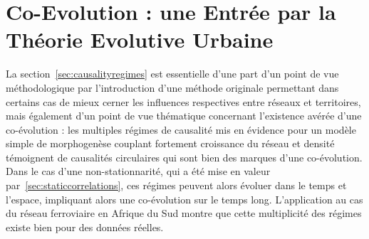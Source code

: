



\chapter[Théorie Evolutive Urbaine]{Co-Evolution : une Entrée par la Théorie Evolutive Urbaine}

\label{ch:evolutiveurban} %





\bigskip




La section~\ref{sec:causalityregimes} est essentielle d'une part d'un point de vue méthodologique par l'introduction d'une méthode originale permettant dans certains cas de mieux cerner les influences respectives entre réseaux et territoires, mais également d'un point de vue thématique concernant l'existence avérée d'une co-évolution : les multiples régimes de causalité mis en évidence pour un modèle simple de morphogenèse couplant fortement croissance du réseau et densité témoignent de causalités circulaires qui sont bien des marques d'une co-évolution. Dans le cas d'une non-stationnarité, qui a été mise en valeur par~\ref{sec:staticcorrelations}, ces régimes peuvent alors évoluer dans le temps et l'espace, impliquant alors une co-évolution sur le temps long. L'application au cas du réseau ferroviaire en Afrique du Sud montre que cette multiplicité des régimes existe bien pour des données réelles. 





